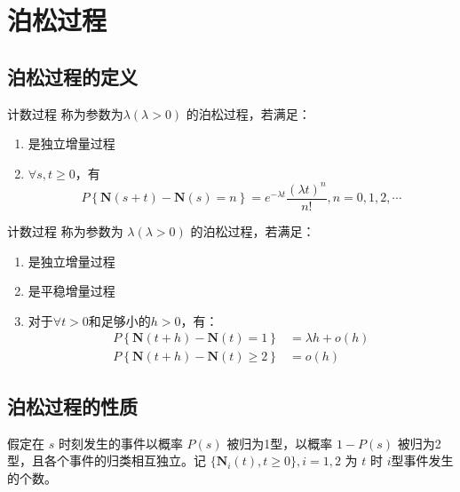 \section{泊松过程}
    \subsection{泊松过程的定义}
        \begin{definition}[泊松过程]
            计数过程 \CountingProcess 称为参数为$\lambda(\lambda > 0)$ 的泊松过程，若满足：
            \begin{enumerate}[label=(\arabic*).]
                \item \CountingProcess 是独立增量过程
                \item $\forall s, t \geq 0$，有 $$ P\left\{ \textbf{N}(s + t) - \textbf{N}(s) = n \right\} = e^{-\lambda t} \frac{(\lambda t)^n}{n !} , n = 0, 1, 2, \cdots $$
            \end{enumerate}
        \end{definition}

        \begin{definition}[泊松过程]
            计数过程 \CountingProcess 称为参数为 $\lambda (\lambda > 0)$ 的泊松过程，若满足：
            \begin{enumerate}[label=(\arabic*).]
                \item \CountingProcess 是独立增量过程
                \item \CountingProcess 是平稳增量过程
                \item 对于$\forall t>0$和足够小的$h > 0$，有：
                \begin{align*}
                    P\left\{ \textbf{N}(t + h) - \textbf{N}(t) = 1 \right\} &= \lambda h + o(h) \\
                    P\left\{ \textbf{N}(t + h) - \textbf{N}(t) \geq 2 \right\} &= o(h)
                \end{align*}

            \end{enumerate}
        \end{definition}
    \subsection{泊松过程的性质}
        \begin{definition}[分类泊松过程]
            假定在 $s$ 时刻发生的事件以概率 $P(s)$ 被归为1型，以概率 $ 1 - P(s) $ 被归为2型，且各个事件的归类相互独立。记 $\{\textbf{N}_i(t), t \geq 0\}, i = 1, 2$ 为 $t$ 时 $i$型事件发生的个数。
        \end{definition}
